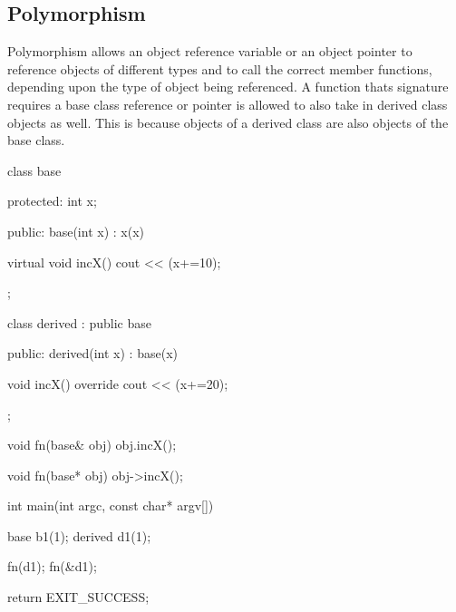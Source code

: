 \documentclass{report}
\begin{document}
    \pagebreak 
    \subsection{Polymorphism}
    \bigbreak \noindent 
    \begin{concept}
       Polymorphism allows an object reference variable or an object pointer to reference objects of different types and to call the correct member functions, depending upon the type of object being referenced. 
       \bigbreak \noindent 
       A function thats signature requires a base class reference or pointer is allowed to also take in derived class objects as well. This is because objects of a derived class are also objects of the base class.
    \end{concept}
    \bigbreak \noindent 
    \begin{cppcode}
        class base {
        protected:
            int x;

        public: 
            base(int x) : x(x) {}

            virtual void incX() { cout << (x+=10); }
        };

        class derived : public base {
        public: 
            derived(int x) : base(x) {}

            void incX() override{
                cout << (x+=20);
            }
        };

        void fn(base& obj) { obj.incX(); }

        void fn(base* obj) { obj->incX(); }

        int main(int argc, const char* argv[]) {

            base b1(1);
            derived d1(1);

            fn(d1);
            fn(&d1);

            return EXIT_SUCCESS;
        }
    \end{cppcode}
    \bigbreak \noindent 
    
    
    \pagebreak
\end{document}
